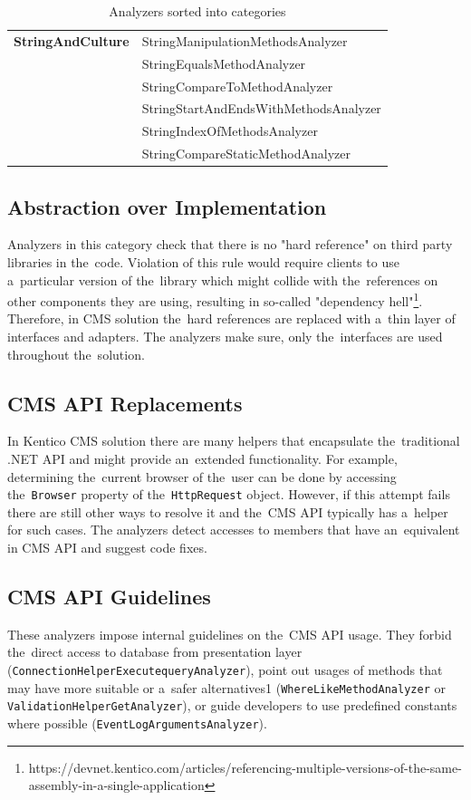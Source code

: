 \documentclass[
  digital, %
  table,   %
  lof,     %
  lot,     %
  oneside,
]{fithesis3}
\begin{document}
\begin{table}
{\begin{tabularx}{1.038\textwidth}{ll}
\textbf{StringAndCulture}
  & StringManipulationMethodsAnalyzer \\
  & StringEqualsMethodAnalyzer \\
  & StringCompareToMethodAnalyzer \\
  & StringStartAndEndsWithMethodsAnalyzer \\
  & StringIndexOfMethodsAnalyzer \\
  & StringCompareStaticMethodAnalyzer \\
\bottomrule
\end{tabularx}
}
\caption{Analyzers sorted into categories}
\label{tab:analyzer-categories-compact-table}
\end{table}

\subsection{Abstraction over Implementation}
Analyzers in this category check that there is no "hard reference" on third party libraries in the~code. Violation of this rule would require clients to use a~particular version of the~library which might collide with the~references on other components they are using, resulting in so-called "dependency hell"\footnote{https://devnet.kentico.com/articles/referencing-multiple-versions-of-the-same-assembly-in-a-single-application}. Therefore, in CMS solution the~hard references are replaced with a~thin layer of interfaces and adapters. The analyzers make sure, only the~interfaces are used throughout the~solution.

\subsection{CMS API Replacements}
In Kentico CMS solution there are many helpers that encapsulate the~traditional .NET API and might provide an~extended functionality. For example, determining the~current browser of the~user can be done by accessing the~\texttt{Browser} property of the~\texttt{HttpRequest} object. However, if this attempt fails there are still other ways to resolve it and the~CMS API typically has a~helper for such cases. The analyzers detect accesses to members that have an~equivalent in CMS API and suggest code fixes. 

\subsection{CMS API Guidelines}
These analyzers impose internal guidelines on the~CMS API usage. They forbid the~direct access to database from presentation layer (\texttt{ConnectionHelperExecutequeryAnalyzer}), point out usages of methods that may have more suitable or a~safer alternatives1 (\texttt{WhereLikeMethodAnalyzer} or \texttt{ValidationHelperGetAnalyzer}), or guide developers to use predefined constants where possible (\texttt{EventLogArgumentsAnalyzer}).
\end{document}
